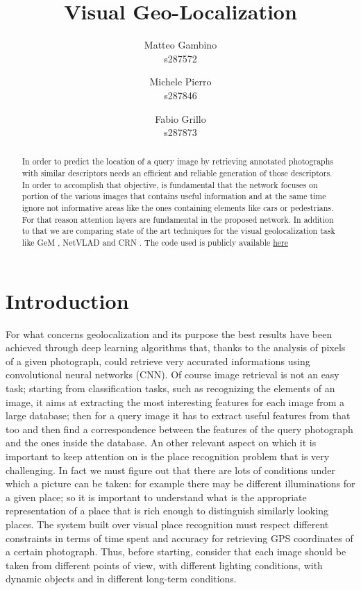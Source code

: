 \documentclass[10pt,twocolumn,letterpaper]{article}
\begin{document}
	
\title{Visual Geo-Localization}

\author{Matteo Gambino\\
	s287572
	\and
	Michele Pierro\\
	s287846
	\and
	Fabio Grillo\\
	s287873
}
\maketitle

\begin{abstract}
	In order to predict the location of a query image by retrieving annotated photographs with 
	similar descriptors needs an efficient and reliable generation of those descriptors. 
	In order to accomplish that objective, is fundamental that the network focuses on portion
	of the various images that contains useful information and at the same time ignore not 
	informative areas like the ones containing elements like cars or pedestrians. For that 
	reason attention layers are fundamental in the proposed network. In addition to that we 
	are comparing state of the art techniques for the visual geolocalization task like GeM \cite{GEM}, 
	NetVLAD \cite{NETVLAD} and CRN \cite{CRN}. The code used is publicly available 
	\href{https://github.com/matteo6198/project_visual_geolocalization}{here}
\end{abstract}

\section{Introduction}
	For what concerns geolocalization and its purpose the best results have been achieved through
	deep learning algorithms that, thanks to the analysis of pixels of a given photograph, could retrieve 
	very accurated informations using convolutional neural networks (CNN). Of course image retrieval
	is not an easy task; starting from classification tasks, such as recognizing the elements of an image,
	it aims at extracting the most interesting features for each image from a large database; then for a query image
	it has to extract useful features from that too and then  find a correspondence between the features
	of the query photograph and the ones inside the database. 
	\newline An other relevant aspect on which it is important to keep attention on is the place recognition problem that
	is very challenging. In fact we must figure out that there are lots of conditions under which a picture can be taken:
	for example there may be different illuminations for a given place; so it is important to understand what is the appropriate 
	representation of a place that is rich enough to distinguish similarly looking places. The system built over
	visual place recognition must respect different constraints in terms of time spent and accuracy for retrieving GPS coordinates
	of a certain photograph. Thus, before starting, consider that each image should be taken
	from different points of view, with different lighting conditions, with dynamic objects and in different long-term conditions.
\end{document}
